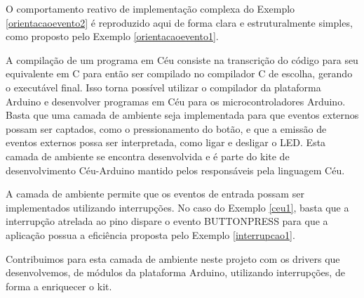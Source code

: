 \documentclass{article}
\begin{document}
\par O comportamento reativo de implementação complexa do Exemplo \ref{orientacaoevento2} é reproduzido aqui de forma clara e estruturalmente simples, como proposto pelo Exemplo \ref{orientacaoevento1}.
\par A compilação de um programa em Céu consiste na transcrição do código para seu equivalente em C para então ser compilado no compilador C de escolha, gerando o executável final. Isso torna possível utilizar o compilador da plataforma Arduino e desenvolver programas em Céu para os microcontroladores Arduino. Basta que uma camada de ambiente seja implementada para que eventos externos possam ser captados, como o pressionamento do botão, e que a emissão de eventos externos possa ser interpretada, como ligar e desligar o LED. Esta camada de ambiente se encontra desenvolvida e é parte do kite de desenvolvimento Céu-Arduino mantido pelos responsáveis pela linguagem Céu\cite{githubceuarduino}.
\par A camada de ambiente permite que os eventos de entrada possam ser implementados utilizando interrupções. No caso do Exemplo \ref{ceu1}, basta que a interrupção atrelada ao pino dispare o evento BUTTON\textunderscore PRESS para que a aplicação possua a eficiência proposta pelo Exemplo \ref{interrupcao1}.
\par Contribuimos para esta camada de ambiente neste projeto com os drivers que desenvolvemos, de módulos da plataforma Arduino, utilizando interrupções, de forma a enriquecer o kit.
\end{document}
